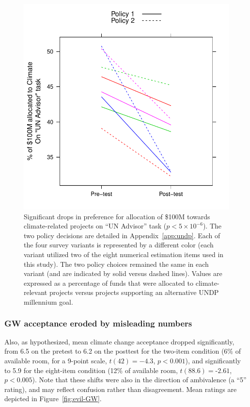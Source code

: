 \begin{figure}
    \centering
    \includegraphics{evil-alloc.pdf}
    \caption{Significant drops in preference for allocation of \$100M towards
        climate-related projects on “UN Advisor” task ($p<5\times10^{-6}$). The
        two policy decisions are detailed in Appendix~\ref{app:undp}. Each of
        the four survey variants is represented by a different color (each
        variant utilized two of the eight numerical estimation items used in
        this study). The two policy choices remained the same in each variant
        (and are indicated by solid versus dashed lines). Values are expressed
        as a percentage of funds that were allocated to climate-relevant
        projects versus projects supporting an alternative UNDP millennium
        goal.}
    \label{fig:evil-alloc}
\end{figure}

\subsubsection{GW acceptance eroded by misleading numbers}

Also, as hypothesized, mean climate change acceptance dropped significantly,
from 6.5 on the pretest to 6.2 on the posttest for the two-item condition (6\%
of available room, for a 9-point scale, $t(42)=-4.3$, $p<0.001$), and
significantly to 5.9 for the eight-item condition (12\% of available room,
$t(88.6)=‑2.61$, $p<0.005$).  Note that these shifts were also in the direction
of ambivalence (a ``5'' rating), and may reflect confusion rather than
disagreement. Mean ratings are depicted in Figure~\ref{fig:evil-GW}.

